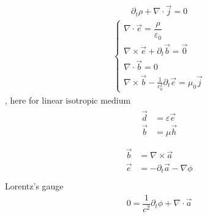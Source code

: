 \documentclass[letterpaper,10pt,english]{jupyterBook}
\begin{document}
\sphinxAtStartPar
{}
\begin{equation*}
\begin{split}\partial_t \rho + \nabla \cdot \vec{j} = 0\end{split}
\end{equation*}
\sphinxAtStartPar
{}
\begin{equation*}
\begin{split}\begin{cases}
    \nabla \cdot \vec{e} = \dfrac{\rho}{\varepsilon_0} \\
    \nabla \times \vec{e} + \partial_t \vec{b} = \vec{0} \\ 
    \nabla \cdot \vec{b} = 0 \\
    \nabla \times \vec{b} - \frac{1}{c_0^2} \partial_t \vec{e} = \mu_0 \vec{j} 
  \end{cases}\end{split}
\end{equation*}
\sphinxAtStartPar
{}, here for linear isotropic medium
\begin{equation*}
\begin{split}\begin{aligned}
  \vec{d} & = \varepsilon \vec{e} \\
  \vec{b} & = \mu         \vec{h} \\
\end{aligned}\end{split}
\end{equation*}
\sphinxAtStartPar
{}
\begin{equation*}
\begin{split}\begin{aligned}
      \vec{b} & = \nabla \times \vec{a} \\
      \vec{e} & = -\partial_t \vec{a} - \nabla \phi \\
   \end{aligned}\end{split}
\end{equation*}
\sphinxAtStartPar
{} Lorentz’s gauge
\begin{equation*}
\begin{split}0 = \dfrac{1}{c^2} \partial_t \phi + \nabla \cdot \vec{a}\end{split}
\end{equation*}
\sphinxAtStartPar
{}
\end{document}
